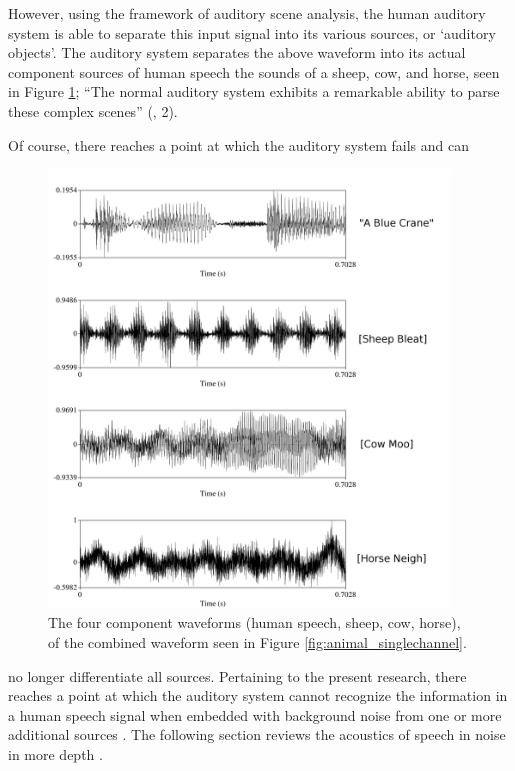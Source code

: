 However, using the framework of auditory scene analysis, the human auditory system is able to separate this input signal into its various sources, or `auditory objects'.  The auditory system separates the above waveform into its actual component sources of human speech \DIFdelbegin {}\DIFdelend \DIFaddbegin {}\DIFaddend the sounds of a sheep, cow, and horse, seen in Figure \ref{fig:animal_multichannel}; ``The normal auditory system exhibits a remarkable ability to parse these complex scenes'' (\cite{middlebrooks:17}, 2).

Of course, there reaches a point at which the auditory system fails and can
%
\begin{figure}[h!]
\centering
  \includegraphics[width=0.95\textwidth]{figure/animal_multichannel-w-text.png}
  \caption{The four component waveforms (human speech, sheep, cow, horse), of the combined waveform seen in Figure \ref{fig:animal_singlechannel}.}
  \label{fig:animal_multichannel}
\end{figure}
%
 no longer differentiate all sources. Pertaining to the present research, there reaches a point at which the auditory system cannot recognize the information in a human speech signal when embedded with background noise from one or more additional sources \DIFaddbegin {}\DIFaddend .  The following section reviews the acoustics of speech in noise in more depth .

